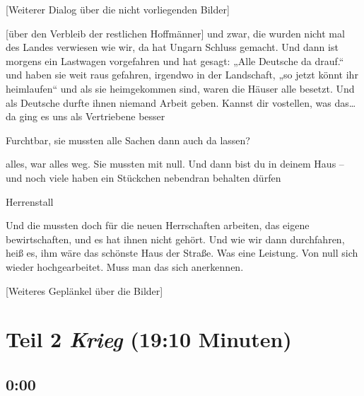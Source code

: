 \documentclass[ngerman,]{article}
\providecommand{\tightlist}{%
  \setlength{\itemsep}{0pt}\setlength{\parskip}{0pt}}
\begin{document}
\begin{multicols}{3}
{[}Weiterer Dialog über die nicht vorliegenden Bilder{]}

\begin{description}
\tightlist
\item[Käthe]
{[}über den Verbleib der restlichen Hoffmänner{]} und zwar, die wurden
nicht mal des Landes verwiesen wie wir, da hat Ungarn Schluss gemacht.
Und dann ist morgens ein Lastwagen vorgefahren und hat gesagt: „Alle
Deutsche da drauf.“ und haben sie weit raus gefahren, irgendwo in der
Landschaft, „so jetzt könnt ihr heimlaufen“ und als sie heimgekommen
sind, waren die Häuser alle besetzt. Und als Deutsche durfte ihnen
niemand Arbeit geben. Kannst dir vostellen, was das\ldots{} da ging es
uns als Vertriebene besser
\item[Ruth]
Furchtbar, sie mussten alle Sachen dann auch da lassen?
\item[Käthe]
alles, war alles weg. Sie mussten mit null. Und dann bist du in deinem
Haus – und noch viele haben ein Stückchen nebendran behalten dürfen
\item[Friedrich]
Herrenstall
\item[Käthe]
Und die mussten doch für die neuen Herrschaften arbeiten, das eigene
bewirtschaften, und es hat ihnen nicht gehört. Und wie wir dann
durchfahren, heiß es, ihm wäre das schönste Haus der Straße. Was eine
Leistung. Von null sich wieder hochgearbeitet. Muss man das sich
anerkennen.
\end{description}

{[}Weiteres Geplänkel über die Bilder{]}

\hypertarget{krieg}{%
\section{\texorpdfstring{Teil 2 \emph{Krieg} (19:10
Minuten)}{Teil 2 Krieg (19:10 Minuten)}}\label{krieg}}

\hypertarget{section-3}{%
\subsection{0:00}\label{section-3}}


\end{multicols}
\end{document}
